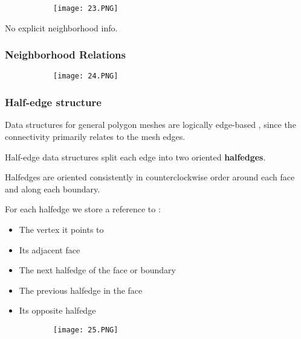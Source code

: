 \documentclass{article}
\begin{document}
\begin{figure}[ht!]
  \centering
  \begin{subfigure}[b]{0.3\linewidth}
    \texttt{[image: 23.PNG]}
  \end{subfigure}
\end{figure}

No explicit neighborhood info.

\subsubsection{Neighborhood Relations}

\begin{figure}[ht!]
  \centering
  \begin{subfigure}[b]{0.8\linewidth}
    \texttt{[image: 24.PNG]}
  \end{subfigure}
\end{figure}

\subsubsection{Half-edge structure}


Data structures for general polygon meshes are logically edge-based , since the connectivity primarily relates to the mesh edges.

Half-edge data structures split each edge into two oriented \textbf{halfedges}.

Halfedges are oriented consistently in counterclockwise order around each face and along each boundary.



For each halfedge we store a reference to : 



\begin{itemize}
    \item The vertex it points to
    \item Its adjacent face
    \item The next halfedge of the face or boundary
    \item The previous halfedge in the face
    \item Its opposite halfedge
\end{itemize}

\begin{figure}[ht!]
  \centering
  \begin{subfigure}[b]{0.3\linewidth}
    \texttt{[image: 25.PNG]}
  \end{subfigure}
\end{figure}
\end{document}
